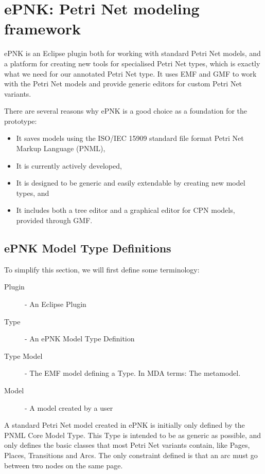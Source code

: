 \section{ePNK: Petri Net modeling framework}
\label{sec:epnk}
ePNK is an Eclipse plugin both for working with standard Petri Net models, and a
platform for creating new tools for specialised Petri Net types, which is
exactly what we need for our annotated Petri Net type. It uses EMF and GMF to
work with the Petri Net models and provide generic editors for custom Petri Net variants.

There are several reasons why ePNK is a good choice as a foundation for the
prototype:
\begin{itemize}
	\item It saves models using the ISO/IEC 15909 \cite{ISO-15909-2} standard file
	format Petri Net Markup Language (PNML),
	\item It is currently actively developed,
	\item It is designed to be generic and easily extendable by creating new model
	types, and
	\item It includes both a tree editor and a graphical editor for CPN models,
	provided through GMF.
\end{itemize}

\subsection{ePNK Model Type Definitions}

To simplify this section, we will first define some terminology:
 \begin{description}
 \item[Plugin] - An Eclipse Plugin 
 \item[Type] - An ePNK Model Type Definition 
 \item[Type Model] - The EMF model defining a Type. In MDA terms: The metamodel.
 \item[Model] - A model created by a user
 \end{description}
 
A standard Petri Net model created in ePNK is initially only defined by the PNML
Core Model Type. This Type is intended to be as generic as possible, and
only defines the basic classes that most Petri Net variants contain, like Pages,
Places, Transitions and Arcs. The only constraint defined is that an arc
must go between two nodes on the same page.

